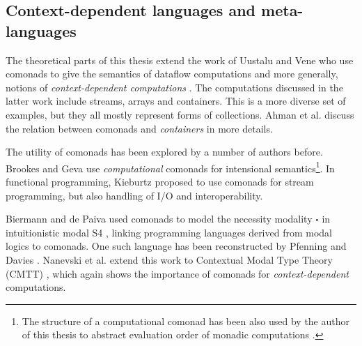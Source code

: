 
\subsection{Context-dependent languages and meta-languages}
\label{sec:path-sem-contextdep}

The theoretical parts of this thesis extend the work of Uustalu and Vene who use comonads
to give the semantics of dataflow computations \cite{app-dataflow-essence} and more generally,
notions of \emph{context-dependent computations} \cite{comonads-notions}. The computations discussed
in the latter work include streams, arrays and containers. This is a more diverse set of examples,
but they all mostly represent forms of collections. Ahman et al. \cite{comonads-containers} discuss
the relation between comonads and \emph{containers} \cite{types-containers} in more details.

The utility of comonads has been explored by a number of authors before. Brookes and Geva
\cite{comonads-computational} use \emph{computational} comonads for intensional semantics\footnote{The
structure of a computational comonad has been also used by the author of this thesis to abstract
evaluation order of monadic computations \cite{comonads-malias}.}. In functional programming,
Kieburtz \cite{comonads-and-codata} proposed to use comonads for stream programming, but also
handling of I/O and interoperability.

Biermann and de Paiva used comonads to model the necessity modality $\square$ in intuitionistic
modal S4 \cite{logic-intuitionistic-modal}, linking programming languages derived from modal
logics to comonads. One such language has been reconstructed by Pfenning and Davies
\cite{logic-modal-reconstruction}. Nanevski et al. extend this work to Contextual Modal Type
Theory (CMTT) \cite{logic-cmtt}, which again shows the importance of comonads for
\emph{context-dependent} computations.

